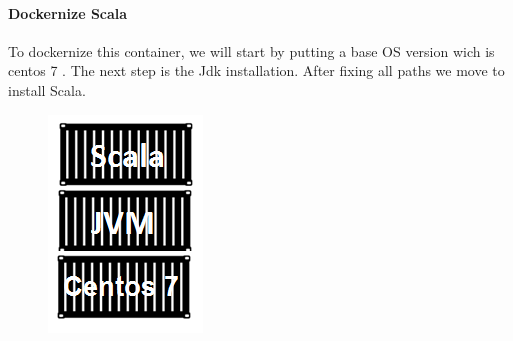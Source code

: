 \paragraph{Dockernize Scala}
\label{sec:sec01}
To dockernize this container, we will start by putting a base OS version wich is centos 7 . 
The next step is the Jdk installation. After fixing all paths we move to install Scala.
\begin{figure}[h!]
	\centering
	\includegraphics[height=0.2\textheight]{fig01/ScalaContainer}
	\label{fig:FilialesEtClients}
\end{figure}

